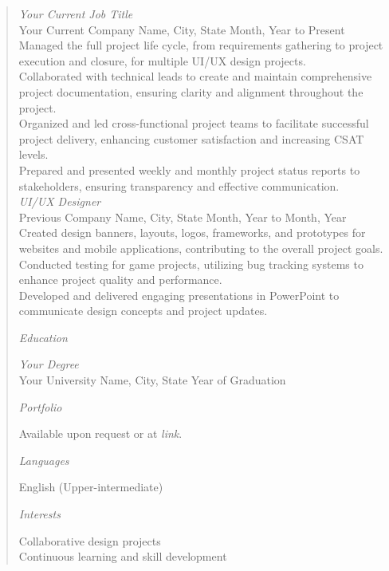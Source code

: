 \begin{quote}
            \textit{Your Current Job Title} \\
            Your Current Company Name, City, State \hfill Month, Year to Present \\
            Managed the full project life cycle, from requirements gathering to project execution and closure, for multiple UI/UX design projects. \\
            Collaborated with technical leads to create and maintain comprehensive project documentation, ensuring clarity and alignment throughout the project. \\
            Organized and led cross-functional project teams to facilitate successful project delivery, enhancing customer satisfaction and increasing CSAT levels. \\
            Prepared and presented weekly and monthly project status reports to stakeholders, ensuring transparency and effective communication. \\
        
            \vspace{0.5em}
            \textit{UI/UX Designer} \\
            Previous Company Name, City, State \hfill Month, Year to Month, Year \\
            Created design banners, layouts, logos, frameworks, and prototypes for websites and mobile applications, contributing to the overall project goals. \\
            Conducted testing for game projects, utilizing bug tracking systems to enhance project quality and performance. \\
            Developed and delivered engaging presentations in PowerPoint to communicate design concepts and project updates.
        
            \textit{Education}
            
            \textit{Your Degree} \\
            Your University Name, City, State \hfill Year of Graduation
        
            \textit{Portfolio}
            
            Available upon request or at \textit{link}.
        
            \textit{Languages}
            
            English (Upper-intermediate)
        
            \textit{Interests}
            
            Collaborative design projects \\
            Continuous learning and skill development
    \end{quote}
    
